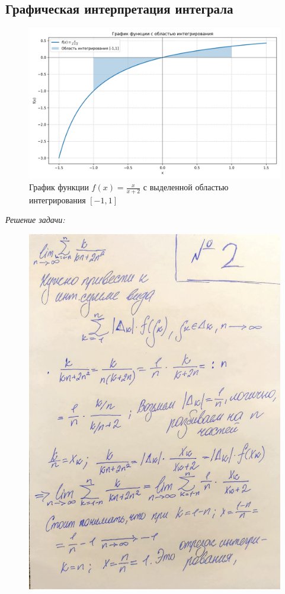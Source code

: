 \documentclass[a4paper,12pt]{article}
\begin{document}
\subsection*{Графическая интерпретация интеграла}

\begin{figure}[H]
    \centering
    \includegraphics[width=0.9\linewidth]{img/integral_plot.png}
    \caption{График функции $f(x) = \frac{x}{x+2}$ с выделенной областью интегрирования $[-1,1]$}
    \label{fig:integral}
\end{figure}

\emph{Решение задачи:}

\begin{figure}[H]
    \centering
    \includegraphics[width=0.8\linewidth]{img/2_1.jpg}
    \caption{}
    \label{fig:part1}
\end{figure}
\end{document}

